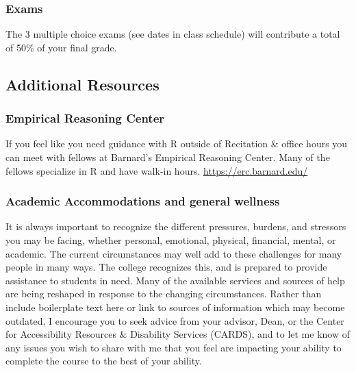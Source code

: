\documentclass[
  letterpaper,
  DIV=11,
  numbers=noendperiod]{scrartcl}
\begin{document}
\hypertarget{exams-1}{%
\subsubsection{Exams}\label{exams-1}}

The 3 multiple choice exams (see dates in class schedule) will
contribute a total of 50\% of your final grade.

\hypertarget{additional-resources}{%
\subsection{Additional Resources}\label{additional-resources}}

\hypertarget{empirical-reasoning-center}{%
\subsubsection{Empirical Reasoning
Center}\label{empirical-reasoning-center}}

If you feel like you need guidance with R outside of Recitation \&
office hours you can meet with fellows at Barnard's Empirical Reasoning
Center. Many of the fellows specialize in R and have walk-in hours.
\url{https://erc.barnard.edu/}

\hypertarget{academic-accommodations-and-general-wellness}{%
\subsubsection{Academic Accommodations and general
wellness}\label{academic-accommodations-and-general-wellness}}

It is always important to recognize the different pressures, burdens,
and stressors you may be facing, whether personal, emotional, physical,
financial, mental, or academic. The current circumstances may well add
to these challenges for many people in many ways. The college recognizes
this, and is prepared to provide assistance to students in need. Many of
the available services and sources of help are being reshaped in
response to the changing circumstances. Rather than include boilerplate
text here or link to sources of information which may become outdated, I
encourage you to seek advice from your advisor, Dean, or the Center for
Accessibility Resources \& Disability Services (CARDS), and to let me
know of any issues you wish to share with me that you feel are impacting
your ability to complete the course to the best of your ability.
\end{document}
